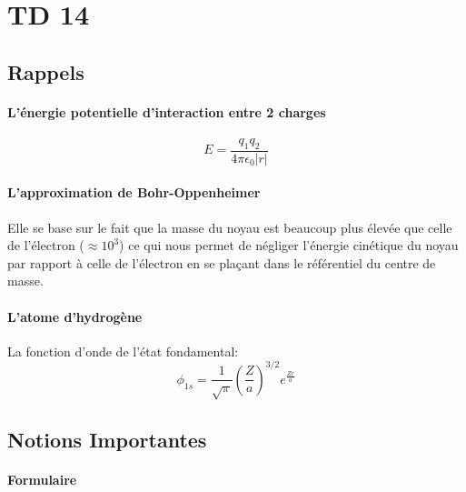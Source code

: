 \section{TD 14}



\subsection{Rappels}


\paragraph{L'énergie potentielle d'interaction entre 2 charges }

$$E= \frac{q_1q_2}{4\pi \epsilon_0 |r|}$$


\paragraph{L'approximation de Bohr-Oppenheimer}

Elle se base sur le fait que la masse du noyau est beaucoup plus élevée que celle de l'électron ($\approx 10^3$) ce qui nous permet de négliger l'énergie cinétique du noyau par rapport à celle de l'électron en se plaçant dans le référentiel du centre de masse.


\paragraph{L'atome d'hydrogène}

La fonction d'onde de l'état fondamental:
$$\phi_{1s}=\frac{1}{\sqrt{\pi}}\left(\frac{Z}{a}\right)^{3/2}e^{\frac{Zr}{a}}$$


\subsection{Notions Importantes}


\paragraph{Formulaire}

\begin{center}
\end{center}


